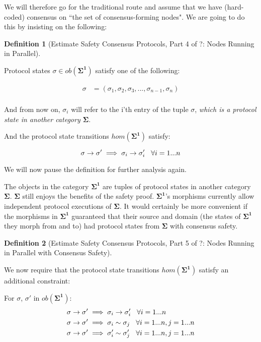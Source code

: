 \documentclass{article}
\theoremstyle{definition}
\newtheorem{defn}{Definition}[section]
\newcommand{\cat}{
	\mathbf
}
\begin{document}
We will therefore go for the traditional route and assume that we have (hard-coded) consensus on ``the set of consensus-forming nodes". We are going to do this by insisting on the following:

\begin{defn}[Estimate Safety Consensus Protocols, Part 4 of ?: Nodes Running in Parallel]
\begin{description}

Protocol states $\sigma \in ob(\cat{\Sigma^1})$ satisfy one of the following:

\begin{align*}
  \sigma &= (\sigma_1,\sigma_2,\sigma_3,...,\sigma_{n-1},\sigma_n)\\
\end{align*}

And from now on, $\sigma_i$ will refer to the i'th entry of the tuple $\sigma$, \emph{which is a protocol state in another category $\cat{\Sigma}$}.

And the protocol state transitions $hom(\cat{\Sigma^1})$ satisfy:

$$
\sigma \to \sigma' \implies \sigma_i \to \sigma'_i \hspace{3mm} \forall i=1...n
$$

We will now pause the definition for further analysis again.

\end{description}
\end{defn}

The objects in the category $\cat{\Sigma^1}$ are tuples of protocol states in another category $\cat{\Sigma}$. $\cat{\Sigma}$ still enjoys the benefits of the safety proof. $\cat{\Sigma^1}$'s morphisms currently allow independent protocol executions of $\cat{\Sigma}$. It would certainly be more convenient if the morphisms in $\cat{\Sigma^1}$ guaranteed that their source and domain (the states of $\cat{\Sigma^1}$ they morph from and to) had protocol states from $\cat{\Sigma}$ with consensus safety.

\begin{defn}[Estimate Safety Consensus Protocols, Part 5 of ?: Nodes Running in Parallel with Consensus Safety]
\begin{description}

We now require that the protocol state transitions $hom(\cat{\Sigma^1})$ satisfy an additional constraint:

For $\sigma$, $\sigma'$ in $ob(\cat{\Sigma^1})$:
\begin{align*}
  \sigma \to \sigma' &\implies \sigma_i \to \sigma'_i \hspace{3mm} \forall i=1...n\\
  \sigma \to \sigma' &\implies \sigma_i \sim \sigma_j \hspace{3mm} \forall i=1...n, j=1...n\\
  \sigma \to \sigma' &\implies \sigma'_i \sim \sigma'_j \hspace{3mm} \forall i=1...n, j=1...n
\end{align*}

\end{description}
\end{defn}
\end{document}
